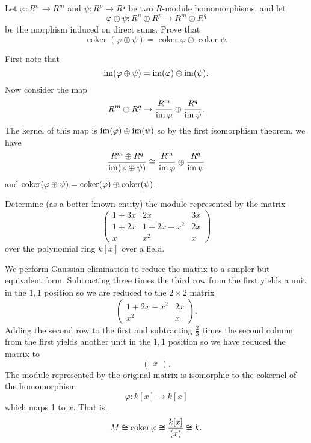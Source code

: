 \documentclass[../../master.tex]{subfiles}
\begin{document}
\begin{problem}
    Let $\varphi : R^{n} \to R^{m}$ and $\psi : R^{p} \to R^{q}$ be two $R$-module homomorphisms, and let
    \[
    \varphi \oplus \psi : R^{n} \oplus R^{p} \to R^{m} \oplus R^{q}
    \]
    be the morphism induced on direct sums.
    Prove that
    \[
        \operatorname{coker}(\varphi \oplus \psi) = \operatorname{coker} \varphi \oplus \operatorname{coker} \psi.
    \]
\end{problem}

\begin{solution}
    First note that
    \[
        \operatorname{im}(\varphi \oplus \psi) = \operatorname{im}(\varphi) \oplus \operatorname{im}(\psi).
    \]
    Now consider the map
    \[
        R^{m} \oplus R^{q} \to \frac{R^{m}}{\operatorname{im} \varphi} \oplus \frac{R^{q}}{\operatorname{im} \psi}.
    \]
    The kernel of this map is $\operatorname{im}(\varphi) \oplus \operatorname{im}(\psi)$ so by the first isomorphism theorem, we have
    \[
        \frac{R^{m} \oplus R^{q}}{\operatorname{im}(\varphi \oplus \psi)} \cong \frac{R^{m}}{\operatorname{im} \varphi} \oplus \frac{R^{q}}{\operatorname{im} \psi}
    \]
    and $\operatorname{coker}(\varphi \oplus \psi) = \operatorname{coker}(\varphi) \oplus \operatorname{coker}(\psi)$.
\end{solution}

\begin{problem}
    Determine (as a better known entity) the module represented by the matrix
    \[
    \begin{pmatrix}
        1 + 3x & 2x & 3x \\
        1 + 2x & 1 + 2x - x^2 & 2x \\
        x & x^2 & x
    \end{pmatrix}
    \]
    over the polynomial ring $k[x]$ over a field.
\end{problem}

\begin{solution}
    We perform Gaussian elimination to reduce the matrix to a simpler but equivalent form.
    Subtracting three times the third row from the first yields a unit in the $1, 1$ position so we are reduced to the $2 \times 2$ matrix
    \[
    \begin{pmatrix}
        1 + 2x - x^2 & 2x \\
        x^2 & x
    \end{pmatrix}.
    \]
    Adding the second row to the first and subtracting $\frac{2}{3}$ times the second column from the first yields another unit in the $1, 1$ position so we have reduced the matrix to
    \[
    \begin{pmatrix}
        x
    \end{pmatrix}.
    \]
    The module represented by the original matrix is isomorphic to the cokernel of the homomorphism
    \[
        \varphi : k[x] \to k[x]
    \]
    which maps 1 to $x$.
    That is,
    \[
        M \cong \operatorname{coker} \varphi \cong \frac{k[x]}{(x)} \cong k.
    \]
\end{solution}
\end{document}
